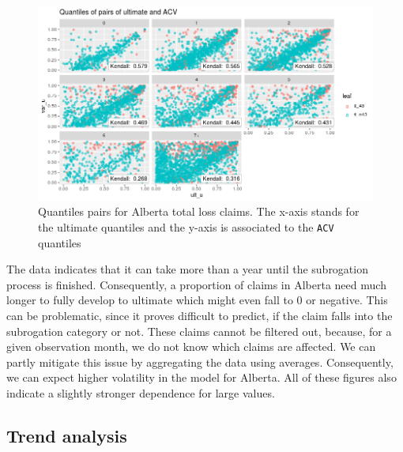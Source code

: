 	\begin{figure}[H]
		\begin{center}
			\includegraphics[scale=0.4]{Graphiques/ab_tl} 
			\renewcommand{\figurename}{Figure}
			\caption[Alberta total loss claims relationship]{Quantiles pairs for Alberta total loss claims. The x-axis stands for the ultimate quantiles and the y-axis is associated to the \texttt{ACV} quantiles}\label{Fig_copula_ab_tl}
		\end{center}
	\end{figure}

	The data indicates that it can take more than a year until the subrogation process is finished. Consequently, a proportion of claims in Alberta need much longer to fully develop to ultimate which might even fall to 0 or negative. This can be problematic, since it proves difficult to predict, if the claim falls into the subrogation category or not. These claims cannot be filtered out, because, for a given observation month, we do not know which claims are affected. We can partly mitigate this issue by aggregating the data using averages. Consequently, we can expect higher volatility in the model for Alberta. 
	All of these figures also indicate a slightly stronger dependence for large values. 
	
	\subsection{Trend analysis}
	
